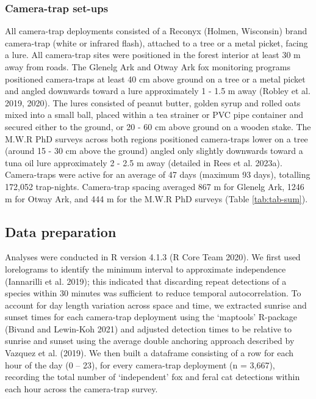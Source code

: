 \documentclass[preprint, 3p, authoryear]{elsarticle} %
\begin{document}
\hypertarget{camera-trap-set-ups}{%
\subsubsection{Camera-trap set-ups}\label{camera-trap-set-ups}}

All camera-trap deployments consisted of a Reconyx (Holmen, Wisconsin) brand camera-trap (white or infrared flash), attached to a tree or a metal picket, facing a lure. All camera-trap sites were positioned in the forest interior at least 30 m away from roads. The Glenelg Ark and Otway Ark fox monitoring programs positioned camera-traps at least 40 cm above ground on a tree or a metal picket and angled downwards toward a lure approximately 1 - 1.5 m away (Robley et al. 2019, 2020). The lures consisted of peanut butter, golden syrup and rolled oats mixed into a small ball, placed within a tea strainer or PVC pipe container and secured either to the ground, or 20 - 60 cm above ground on a wooden stake. The M.W.R PhD surveys across both regions positioned camera-traps lower on a tree (around 15 - 30 cm above the ground) angled only slightly downwards toward a tuna oil lure approximately 2 - 2.5 m away (detailed in Rees et al. 2023a). Camera-traps were active for an average of 47 days (maximum 93 days), totalling 172,052 trap-nights. Camera-trap spacing averaged 867 m for Glenelg Ark, 1246 m for Otway Ark, and 444 m for the M.W.R PhD surveys (Table \ref{tab:tab-sum}).

\hypertarget{data-preparation}{%
\subsection{Data preparation}\label{data-preparation}}

Analyses were conducted in R version 4.1.3 (R Core Team 2020). We first used lorelograms to identify the minimum interval to approximate independence (Iannarilli et al. 2019); this indicated that discarding repeat detections of a species within 30 minutes was sufficient to reduce temporal autocorrelation. To account for day length variation across space and time, we extracted sunrise and sunset times for each camera-trap deployment using the `maptools' R-package (Bivand and Lewin-Koh 2021) and adjusted detection times to be relative to sunrise and sunset using the average double anchoring approach described by Vazquez et al. (2019). We then built a dataframe consisting of a row for each hour of the day (0 -- 23), for every camera-trap deployment (n = 3,667), recording the total number of `independent' fox and feral cat detections within each hour across the camera-trap survey.
\end{document}
